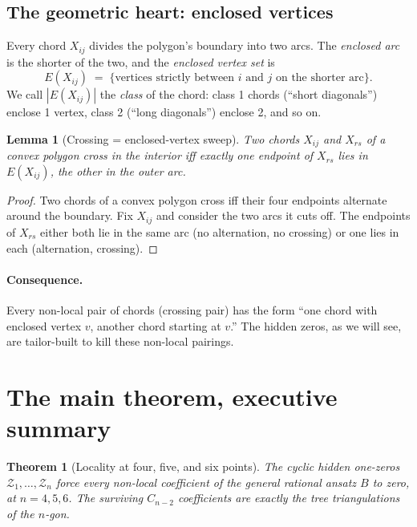 \documentclass[11pt]{article}
\newcommand{\X}[2]{X_{#1#2}}
\newcommand{\Z}{\mathcal{Z}}
\newcommand{\Enc}{E}
\newtheorem{theorem}{Theorem}
\newtheorem{lemma}{Lemma}
\theoremstyle{definition}
\begin{document}
\subsection{The geometric heart: enclosed vertices}

Every chord $\X{i}{j}$ divides the polygon's boundary into two arcs.
The \emph{enclosed arc} is the shorter of the two, and the
\emph{enclosed vertex set} is
\[
\Enc(\X{i}{j}) \;=\; \{\text{vertices strictly between $i$ and $j$ on the shorter arc}\}.
\]
We call $|\Enc(\X{i}{j})|$ the \emph{class} of the chord: class 1 chords
(``short diagonals'') enclose 1 vertex, class 2 (``long diagonals'') enclose 2,
and so on.

\begin{lemma}[Crossing = enclosed-vertex sweep]
\label{lem:crossing}
Two chords $\X{i}{j}$ and $\X{r}{s}$ of a convex polygon cross in the
interior iff exactly one endpoint of $\X{r}{s}$ lies in $\Enc(\X{i}{j})$,
the other in the outer arc.
\end{lemma}

\begin{proof}
Two chords of a convex polygon cross iff their four endpoints alternate
around the boundary. Fix $\X{i}{j}$ and consider the two arcs it cuts off.
The endpoints of $\X{r}{s}$ either both lie in the same arc (no alternation,
no crossing) or one lies in each (alternation, crossing).
\end{proof}

\paragraph{Consequence.}
Every non-local pair of chords (crossing pair) has the form
``one chord with enclosed vertex $v$, another chord starting at $v$.''
The hidden zeros, as we will see, are tailor-built to kill these non-local
pairings.

\section{The main theorem, executive summary}
\label{sec:summary}

\begin{theorem}[Locality at four, five, and six points]
\label{thm:main}
The cyclic hidden one-zeros $\Z_1,\ldots,\Z_n$ force every non-local
coefficient of the general rational ansatz $B$ to zero, at $n=4, 5, 6$.
The surviving $C_{n-2}$ coefficients are exactly the tree triangulations
of the $n$-gon.
\end{theorem}
\end{document}
